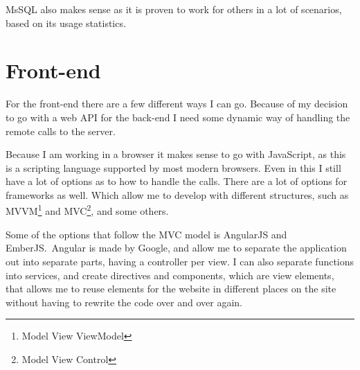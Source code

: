 MsSQL also makes sense as it is proven to work for others in a lot of scenarios,
based on its usage statistics\cite{obdms:gartner}. 

\begin{table}[h]
  \caption{Pros and cons of different types of databases}
\label{tab:sedatabse-pro-con}
\end{table}

\section{Front-end}
\label{sec:Frontend}
For the front-end there are a few different ways I can go. Because of my
decision to go with a web API for the back-end I need some dynamic way of
handling the remote calls to the server. 

Because I am working in a browser it makes sense to go with JavaScript, as this
is a scripting language supported by most modern browsers. Even in this I still
have a lot of options as to how to handle the calls. There are a lot of options
for frameworks as well. Which allow me to develop with different structures,
such as MVVM\footnote{Model View ViewModel} and MVC\footnote{Model View
  Control}, and some others. 

Some of the options that follow the MVC model is AngularJS and EmberJS.\ Angular
is made by Google\cite{angularjs}, and allow me to separate the application out
into separate parts, having a controller per view. I can also separate functions
into services, and create directives and components, which are view elements,
that allows me to reuse elements for the website in different places on the site
without having to rewrite the code over and over again. 

